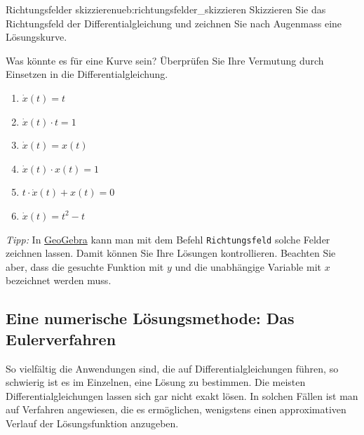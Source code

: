 \begin{ueb}{Richtungsfelder skizzieren}{ueb:richtungsfelder_skizzieren}
    Skizzieren Sie das Richtungsfeld der Differentialgleichung
    und zeichnen Sie nach Augenmass eine Lösungskurve.

    Was könnte es für eine Kurve sein?
    Überprüfen Sie Ihre Vermutung durch Einsetzen in die
    Differentialgleichung.

    \begin{enumerate}
        \item \(\dot{x}(t)=t\)
        \item \(\dot{x}(t)\cdot t=1\)
        \item \(\dot{x}(t)=x(t)\)
        \item \(\dot{x}(t)\cdot x(t)=1\)
        \item \(t\cdot\dot{x}(t)+x(t)=0\)
        \item \(\dot{x}(t)=t^2-t\)
    \end{enumerate}

    \textit{Tipp:} In \href{https://www.geogebra.org/calculator}{GeoGebra} kann man mit dem Befehl
    \texttt{Richtungsfeld} solche Felder zeichnen lassen.
    Damit können Sie Ihre Lösungen kontrollieren.
    Beachten Sie aber, dass die gesuchte Funktion mit \(y\)
    und die unabhängige Variable mit \(x\) bezeichnet
    werden muss.
\end{ueb}































\clearpage

\subsection{Eine numerische Lösungsmethode: Das Eulerverfahren}

So vielfältig die Anwendungen sind, die auf Differentialgleichungen
führen, so schwierig ist es im Einzelnen, eine Lösung zu bestimmen.
Die meisten Differentialgleichungen lassen sich gar nicht exakt lösen.
In solchen Fällen ist man auf Verfahren angewiesen, die es
ermöglichen, wenigstens einen approximativen Verlauf der
Lösungsfunktion anzugeben.

